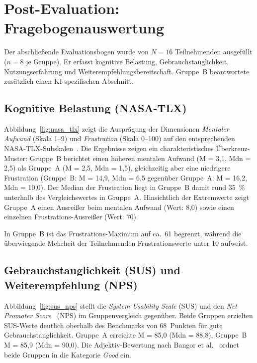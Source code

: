\section{Post-Evaluation: Fragebogenauswertung}\label{sec:evaluation}

Der abschließende Evaluationsbogen wurde von \(N = 16\) Teilnehmenden ausgefüllt (\(n = 8\) je Gruppe). Er erfasst kognitive Belastung, Gebrauchstauglichkeit, Nutzungserfahrung und Weiterempfehlungsbereitschaft. Gruppe~B beantwortete zusätzlich einen KI-spezifischen Abschnitt.

\subsection{Kognitive Belastung (NASA-TLX)}\label{subsec:cognitive_load}

Abbildung~\ref{fig:nasa_tlx} zeigt die Ausprägung der Dimensionen \textit{Mentaler Aufwand} (Skala 1--9) und \textit{Frustration} (Skala 0--100) auf den entsprechenden NASA-TLX-Subskalen~\cite{hartstav1988}. Die Ergebnisse zeigen ein charakteristisches Überkreuz-Muster: Gruppe~B berichtet einen höheren mentalen Aufwand (M = 3{,}1, Mdn = 2{,}5) als Gruppe~A (M = 2{,}5, Mdn = 1{,}5), gleichzeitig aber eine niedrigere Frustration (Gruppe~B: M = 14{,}9, Mdn = 6{,}5 gegenüber Gruppe~A: M = 16{,}2, Mdn = 10{,}0). Der Median der Frustration liegt in Gruppe~B damit rund 35~\% unterhalb des Vergleichswertes in Gruppe~A. Hinsichtlich der Extremwerte zeigt Gruppe~A einen Ausreißer beim mentalen Aufwand (Wert: 8{,}0) sowie einen einzelnen Frustrations-Ausreißer (Wert: 70). 

In Gruppe~B ist das Frustrations-Maximum auf ca.\ 61 begrenzt, während die überwiegende Mehrheit der Teilnehmenden Frustrationswerte unter 10 aufweist.

\subsection{Gebrauchstauglichkeit (SUS) und Weiterempfehlung (NPS)}\label{subsec:sus_nps}

Abbildung~\ref{fig:sus_nps} stellt die \textit{System Usability Scale} (SUS) und den \textit{Net Promoter Score}~\cite{reichheld2003} (NPS) im Gruppenvergleich gegenüber. Beide Gruppen erzielten SUS-Werte deutlich oberhalb des Benchmarks von 68~Punkten für gute Gebrauchstauglichkeit. Gruppe~A erreichte M = 85{,}0 (Mdn = 88{,}8), Gruppe~B M = 85{,}9 (Mdn = 90{,}0). Die Adjektiv-Bewertung nach Bangor et al.~\cite{bangor2009} ordnet beide Gruppen in die Kategorie \textit{Good} ein.


